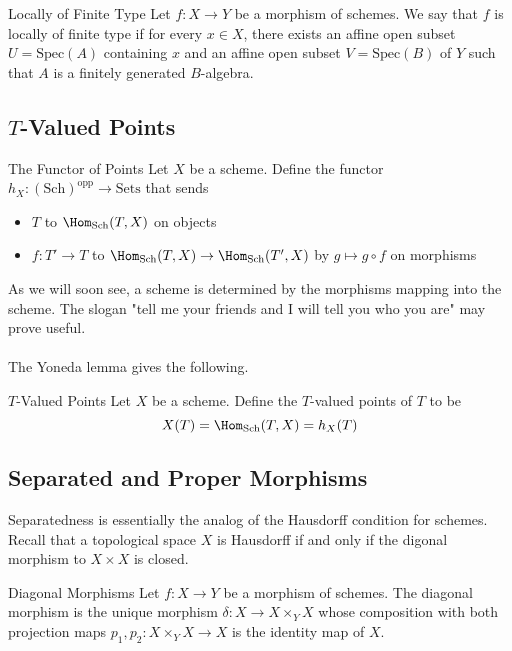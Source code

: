 \documentclass[a4paper]{article}
\begin{document}
\begin{defn}{Locally of Finite Type}{} Let $f:X\to Y$ be a morphism of schemes. We say that $f$ is locally of finite type if for every $x\in X$, there exists an affine open subset $U=\text{Spec}(A)$ containing $x$ and an affine open subset $V=\text{Spec}(B)$ of $Y$ such that $A$ is a finitely generated $B$-algebra. 
\end{defn}

\subsection{$T$-Valued Points}
\begin{defn}{The Functor of Points}{} Let $X$ be a scheme. Define the functor $h_X:(\text{Sch})^{\text{opp}}\to\text{Sets}$ that sends
\begin{itemize}
\item $T$ to $\Hom_{\text{Sch}}(T,X)$ on objects
\item $f:T'\to T$ to $\Hom_{\text{Sch}}(T,X)\to\Hom_{\text{Sch}}(T',X)$ by $g\mapsto g\circ f$ on morphisms
\end{itemize}
\end{defn}

As we will soon see, a scheme is determined by the morphisms mapping into the scheme. The slogan "tell me your friends and I will tell you who you are" may prove useful. \\~\\

The Yoneda lemma gives the following. 

\begin{prp}{}{}
\end{prp}

\begin{defn}{$T$-Valued Points}{} Let $X$ be a scheme. Define the $T$-valued points of $T$ to be $$X(T)=\Hom_{\text{Sch}}(T,X)=h_X(T)$$
\end{defn}

\subsection{Separated and Proper Morphisms}
Separatedness is essentially the analog of the Hausdorff condition for schemes. Recall that a topological space $X$ is Hausdorff if and only if the digonal morphism to $X\times X$ is closed. 

\begin{defn}{Diagonal Morphisms}{} Let $f:X\to Y$ be a morphism of schemes. The diagonal morphism is the unique morphism $\delta:X\to X\times_Y X$ whose composition with both projection maps $p_1,p_2:X\times_Y X\to X$ is the identity map of $X$. 
\end{defn}
\end{document}
